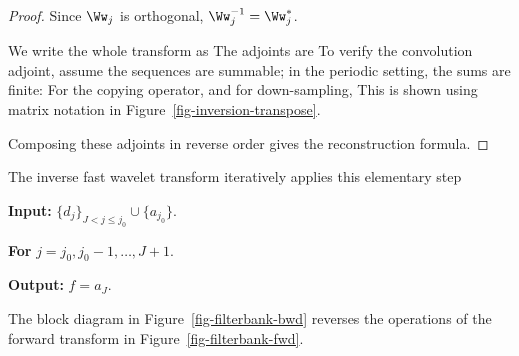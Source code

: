 \begin{proof}
Since $\Ww_j$ is orthogonal, $\Ww_j^{-1} = \Ww_j^*$.
 
We write the whole transform as 
The adjoints are
To verify the convolution adjoint, assume the sequences are summable; in the periodic setting, the sums are finite:
For the copying operator,
and for down-sampling,
This is shown using matrix notation in Figure~\ref{fig-inversion-transpose}.
 
Composing these adjoints in reverse order gives the reconstruction formula.
\end{proof}



The inverse fast wavelet transform iteratively applies this elementary step
\begin{rs}
	\item \textbf{Input:} $\{d_j\}_{J<j\leq j_0} \cup \{ a_{j_0} \}$.
	\item \textbf{For} $j=j_0,j_0-1,\ldots,J+1$.
	\item \textbf{Output:} $f = a_J$.
\end{rs}
The block diagram in Figure~\ref{fig-filterbank-bwd} reverses the operations of the forward transform in Figure~\ref{fig-filterbank-fwd}.



                                                   
                                                   
